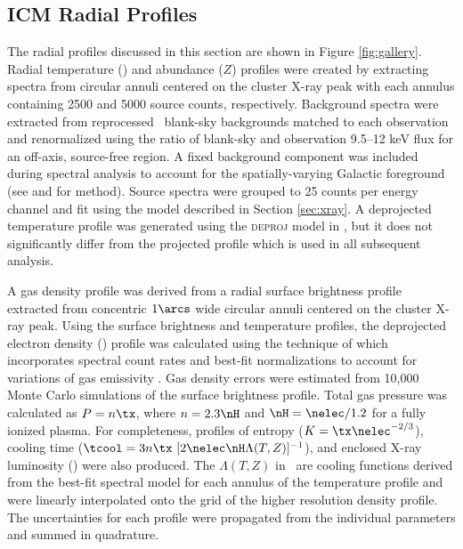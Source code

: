 \documentclass[useAMS,usenatbib]{mn2e}
\begin{document}
\subsection{ICM Radial Profiles}

The radial profiles discussed in this section are shown in Figure
\ref{fig:gallery}. Radial temperature (\tx) and abundance ($Z$)
profiles were created by extracting spectra from circular annuli
centered on the cluster X-ray peak with each annulus containing 2500
and 5000 source counts, respectively. Background spectra were
extracted from reprocessed \caldb\ blank-sky backgrounds matched to
each observation and renormalized using the ratio of blank-sky and
observation 9.5--12 keV flux for an off-axis, source-free region. A
fixed background component was included during spectral analysis to
account for the spatially-varying Galactic foreground (see
\citealt{2005ApJ...628..655V} and \citealt{xrayband} for
method). Source spectra were grouped to 25 counts per energy channel
and fit using the model described in Section \ref{sec:xray}. A
deprojected temperature profile was generated using the
\textsc{deproj} model in \xspec, but it does not significantly differ
from the projected profile which is used in all subsequent analysis.

A gas density profile was derived from a radial surface brightness
profile extracted from concentric $1\arcs$ wide circular annuli
centered on the cluster X-ray peak. Using the surface brightness and
temperature profiles, the deprojected electron density (\nelec)
profile was calculated using the technique of \citet{kriss83} which
incorporates spectral count rates and best-fit normalizations to
account for variations of gas emissivity \citep[see][for method
  details]{accept}. Gas density errors were estimated from 10,000
Monte Carlo simulations of the surface brightness profile. Total gas
pressure was calculated as $P = n \tx$, where $n = 2.3 \nH$ and $\nH =
\nelec/1.2$ for a fully ionized plasma. For completeness, profiles of
entropy ($K = \tx\nelec^{-2/3}$), cooling time ($\tcool =
3n\tx~[2\nelec \nH \Lambda(T,Z)]^{-1}$), and enclosed X-ray luminosity
(\lx) were also produced. The $\Lambda(T,Z)$ in \tcool\ are cooling
functions derived from the best-fit spectral model for each annulus of
the temperature profile and were linearly interpolated onto the grid
of the higher resolution density profile. The uncertainties for each
profile were propagated from the individual parameters and summed in
quadrature.
\end{document}
